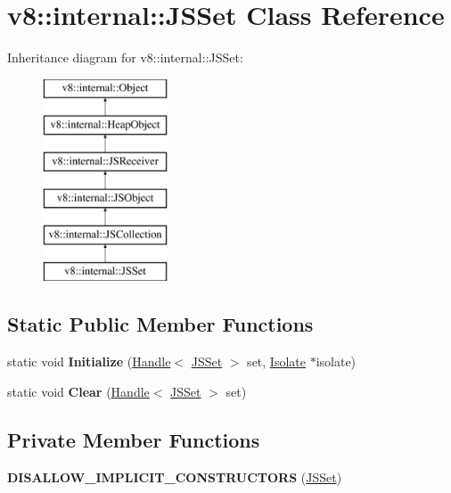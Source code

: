 \hypertarget{classv8_1_1internal_1_1_j_s_set}{}\section{v8\+:\+:internal\+:\+:J\+S\+Set Class Reference}
\label{classv8_1_1internal_1_1_j_s_set}
Inheritance diagram for v8\+:\+:internal\+:\+:J\+S\+Set\+:\begin{figure}[H]
\begin{center}
\leavevmode
\includegraphics[height=6.000000cm]{classv8_1_1internal_1_1_j_s_set}
\end{center}
\end{figure}
\subsection*{Static Public Member Functions}
\begin{DoxyCompactItemize}
\item 
static void {\bfseries Initialize} (\hyperlink{classv8_1_1internal_1_1_handle}{Handle}$<$ \hyperlink{classv8_1_1internal_1_1_j_s_set}{J\+S\+Set} $>$ set, \hyperlink{classv8_1_1internal_1_1_isolate}{Isolate} $\ast$isolate)\hypertarget{classv8_1_1internal_1_1_j_s_set_a9919901ec14e21383c23a9f05e4890f5}{}\label{classv8_1_1internal_1_1_j_s_set_a9919901ec14e21383c23a9f05e4890f5}

\item 
static void {\bfseries Clear} (\hyperlink{classv8_1_1internal_1_1_handle}{Handle}$<$ \hyperlink{classv8_1_1internal_1_1_j_s_set}{J\+S\+Set} $>$ set)\hypertarget{classv8_1_1internal_1_1_j_s_set_a785a164ee04a6eaed115a022072d4673}{}\label{classv8_1_1internal_1_1_j_s_set_a785a164ee04a6eaed115a022072d4673}

\end{DoxyCompactItemize}
\subsection*{Private Member Functions}
\begin{DoxyCompactItemize}
\item 
{\bfseries D\+I\+S\+A\+L\+L\+O\+W\+\_\+\+I\+M\+P\+L\+I\+C\+I\+T\+\_\+\+C\+O\+N\+S\+T\+R\+U\+C\+T\+O\+RS} (\hyperlink{classv8_1_1internal_1_1_j_s_set}{J\+S\+Set})\hypertarget{classv8_1_1internal_1_1_j_s_set_ab4e66123eb0459a5e3d196304ce407eb}{}\label{classv8_1_1internal_1_1_j_s_set_ab4e66123eb0459a5e3d196304ce407eb}

\end{DoxyCompactItemize}
